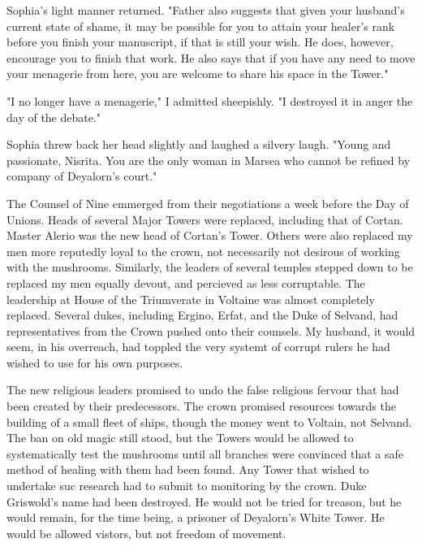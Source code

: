 \documentclass{article}
\begin{document}
Sophia's light manner returned. "Father also suggests that given your husband's current state of shame, it may be possible for you to attain your healer's rank before you finish your manuscript, if that is still your wish. He does, however, encourage you to finish that work. He also says that if you have any need to move your menagerie from here, you are welcome to share his space in the Tower."

"I no longer have a menagerie," I admitted sheepishly. "I destroyed it in anger the day of the debate."

Sophia threw back her head slightly and laughed a silvery laugh. "Young and passionate, Nisrita. You are the only woman in Marsea who cannot be refined by company of Deyalorn's court."

\vspace{.5cm}

The Counsel of Nine emmerged from their negotiations a week before the Day of Unions. Heads of several Major Towers were replaced, including that of Cortan. Master Alerio was the new head of Cortan's Tower. Others were also replaced my men more reputedly loyal to the crown, not necessarily not desirous of working with the mushrooms. Similarly, the leaders of several temples stepped down to be replaced my men equally devout, and percieved as less corruptable. The leadership at House of the Triumverate in Voltaine was almost completely replaced. Several dukes, including Ergino, Erfat, and the Duke of Selvand, had representatives from the Crown pushed onto their counsels. My husband, it would seem, in his overreach, had toppled the very systemt of corrupt rulers he had wished to use for his own purposes.

The new religious leaders promised to undo the false religious fervour that had been created by their predecessors. The crown promised resources towards the building of a small fleet of ships, though the money went to Voltain, not Selvand. The ban on old magic still stood, but the Towers would be allowed to systematically test the mushrooms until all branches were convinced that a safe method of healing with them had been found. Any Tower that wished to undertake suc research had to submit to monitoring by the crown. Duke Griswold's name had been destroyed. He would not be tried for treason, but he would remain, for the time being, a prisoner of Deyalorn's White Tower. He would be allowed vistors, but not freedom of movement.
\end{document}
